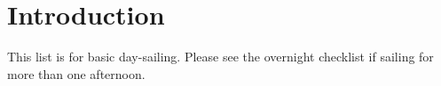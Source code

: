 \documentclass[fleqn,10pt]{navy} %
\affiliation{\textit{Updated by MIDN 2/C Ginelli}} %
\newlength{\tocsep}
\begin{document}

\flushbottom %

\maketitle %

\tableofcontents %

\thispagestyle{empty} %


\section*{Introduction} %

This list is for basic day-sailing.  Please see the overnight checklist if sailing for more than one afternoon.
\end{document}
